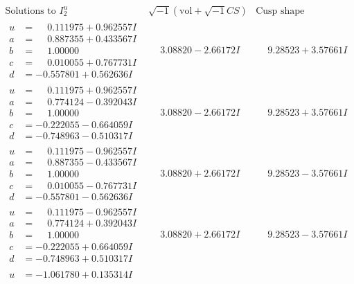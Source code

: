 \documentclass[1p]{elsarticle_modified}
\theoremstyle{definition}
\newcommand{\I}{\sqrt{-1}}
\begin{document}
$$\begin{array}{c|c|c}  
\text{Solutions to }I^u_{2}& \I (\text{vol} + \sqrt{-1}CS) & \text{Cusp shape}\\
 \hline 
\begin{aligned}
u &= \phantom{-}0.111975 + 0.962557 I \\
a &= \phantom{-}0.887355 + 0.433567 I \\
b &= \phantom{-}1.00000\phantom{ +0.000000I} \\
c &= \phantom{-}0.010055 + 0.767731 I \\
d &= -0.557801 + 0.562636 I\end{aligned}
 & \phantom{-}3.08820 - 2.66172 I & \phantom{-}9.28523 + 3.57661 I \\ \hline\begin{aligned}
u &= \phantom{-}0.111975 + 0.962557 I \\
a &= \phantom{-}0.774124 - 0.392043 I \\
b &= \phantom{-}1.00000\phantom{ +0.000000I} \\
c &= -0.222055 - 0.664059 I \\
d &= -0.748963 - 0.510317 I\end{aligned}
 & \phantom{-}3.08820 - 2.66172 I & \phantom{-}9.28523 + 3.57661 I \\ \hline\begin{aligned}
u &= \phantom{-}0.111975 - 0.962557 I \\
a &= \phantom{-}0.887355 - 0.433567 I \\
b &= \phantom{-}1.00000\phantom{ +0.000000I} \\
c &= \phantom{-}0.010055 - 0.767731 I \\
d &= -0.557801 - 0.562636 I\end{aligned}
 & \phantom{-}3.08820 + 2.66172 I & \phantom{-}9.28523 - 3.57661 I \\ \hline\begin{aligned}
u &= \phantom{-}0.111975 - 0.962557 I \\
a &= \phantom{-}0.774124 + 0.392043 I \\
b &= \phantom{-}1.00000\phantom{ +0.000000I} \\
c &= -0.222055 + 0.664059 I \\
d &= -0.748963 + 0.510317 I\end{aligned}
 & \phantom{-}3.08820 + 2.66172 I & \phantom{-}9.28523 - 3.57661 I \\ \hline\begin{aligned}
u &= -1.061780 + 0.135314 I \\

\end{aligned}
\end{array}$$
\end{document}
